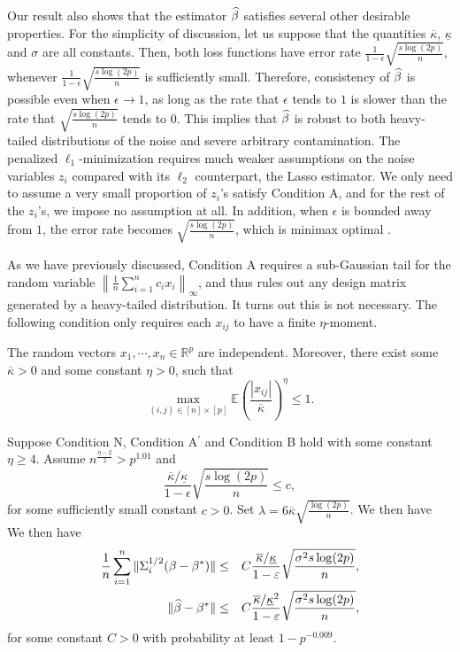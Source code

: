 Our result also shows that the estimator $\widehat{\beta}$ satisfies several other desirable properties. For the simplicity of discussion, let us suppose that the quantities $\overline{\kappa}$, $\underline{\kappa}$ and $\sigma$ are all constants. Then, both loss functions have error rate $\frac{1}{1-\epsilon}\sqrt{\frac{s\log(2p)}{n}}$, whenever $\frac{1}{1-\epsilon}\sqrt{\frac{s\log(2p)}{n}}$ is sufficiently small. Therefore, consistency of $\widehat{\beta}$ is possible even when $\epsilon\rightarrow 1$, as long as the rate that $\epsilon$ tends to $1$ is slower than the rate that $\sqrt{\frac{s\log(2p)}{n}}$ tends to $0$. This implies that $\widehat{\beta}$ is robust to both heavy-tailed distributions of the noise and severe arbitrary contamination. The penalized $\ell_1$-minimization requires much weaker assumptions on the noise variables $z_i$ compared with its $\ell_2$ counterpart, the Lasso estimator. We only need to assume a very small proportion of $z_i$'s satisfy Condition A, and for the rest of the $z_i$'s, we impose no assumption at all. In addition, when $\epsilon$ is bounded away from $1$, the error rate becomes $\sqrt{\frac{s\log(2p)}{n}}$, which is minimax optimal \citep{raskutti2011minimax}.


As we have previously discussed, Condition A requires a sub-Gaussian tail for the random variable $\left\|\frac{1}{n}\sum_{i=1}^nc_ix_i\right\|_{\infty}$, and thus rules out any design matrix generated by a heavy-tailed distribution. It turns out this is not necessary. The following condition only requires each $x_{ij}$ to have a finite $\eta$-moment.

\begin{conda'}
The random vectors $x_1,\cdots,x_n\in\mathbb{R}^p$ are independent. Moreover, there exist some $\overline{\kappa}>0$ and some constant $\eta>0$, such that
$$\max_{(i,j)\in[n]\times [p]}\mathbb{E}\left(\frac{|x_{ij}|}{\overline{\kappa}}\right)^{\eta}\leq 1.$$
\end{conda'}

\begin{thm}\label{thm:heavy}
Suppose Condition N, Condition A${}^\prime$ and Condition B hold with some constant $\eta\geq 4$. Assume $n^{\frac{\eta-2}{2}}>p^{1.01}$ and
$$\frac{\overline{\kappa}/\underline{\kappa}}{1-\epsilon}\sqrt{\frac{s\log(2p)}{n}}\leq c,$$
for some sufficiently small constant $c>0$. Set $\lambda=6\overline{\kappa}\sqrt{\frac{\log(2p)}{n}}$. We then have
We then have
\begin{eqnarray*}
\frac{1}{n}\sum_{i=1}^n\|\Sigma_i^{1/2}(\beta-\beta^*)\| &\leq& C\frac{\overline{\kappa}/\underline{\kappa}}{1-\epsilon}\sqrt{\frac{\sigma^2s\log(2p)}{n}}, \\
\|\wh{\beta}-\beta^*\| &\leq& C\frac{\overline{\kappa}/\underline{\kappa}^2}{1-\epsilon}\sqrt{\frac{\sigma^2s\log(2p)}{n}},
\end{eqnarray*}
for some constant $C>0$ with probability at least $1-p^{-0.009}$.
\end{thm}

